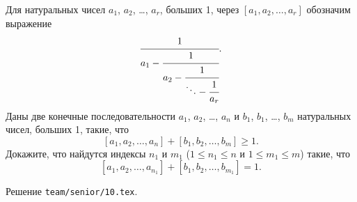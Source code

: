 \problem{}
Для натуральных чисел $a_1$, $a_2$, \ldots, $a_r$, больших 1, через
$[a_1, a_2, \ldots, a_r]$ обозначим выражение
\[
    \cfrac{1}{
        a_1 - \cfrac{1}{
            a_2 - \cfrac{1}{
                \ddots - \cfrac{1}{a_r} } } }
.\]
Даны две конечные последовательности
$a_1$, $a_2$, \ldots, $a_n$ и $b_1$, $b_1$, \ldots, $b_m$
натуральных чисел, больших 1, такие, что
\[
    [a_1, a_2, \ldots, a_n] + [b_1, b_2, \ldots, b_m] \geq 1
.\]
Докажите, что найдутся индексы $n_1$ и $m_1$
($1 \leq n_1 \leq n$ и $1 \leq m_1 \leq m$)
такие, что
\[
    [a_1, a_2, \ldots, a_{n_1}] + [b_1, b_2, \ldots, b_{m_1}] = 1
.\]

\solution
Решение \texttt{team/senior/10.tex}.
\endproblem
